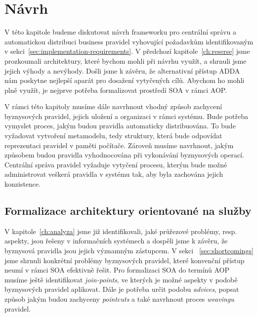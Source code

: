 

\chapter{Návrh}\label{ch:navrh}

V této kapitole budeme diskutovat návrh frameworku pro centrální správu
a automatickou distribuci business pravidel vyhovující požadavkům identifikovaným
v sekci~\ref{sec:implementation-requirements}. V předchozí kapitole~\ref{ch:reserse}
jsme prozkoumali architektury, které bychom mohli při návrhu využít, a shrnuli
jsme jejich výhody a nevýhody. Došli jsme k závěru, že alternativní přístup \gls{ADDA}
nám poskytne nejlepší aparát pro dosažení vytyčených cílů. Abychom ho mohli plně využít,
je nejprve potřeba formalizovat prostředí \gls{SOA} v rámci \gls{AOP}.

V rámci této kapitoly musíme dále navrhnout vhodný způsob zachycení byznysových pravidel,
jejich uložení a organizaci v rámci systému. Bude potřeba vymyslet proces, jakým budou pravidla
automaticky distribuována.
To bude vyžadovat vytvoření metamodelu, tedy struktury, která bude odpovídat reprezentaci pravidel
v paměti počítače.
Zároveň musíme navrhnout, jakým způsobem budou pravidla vyhodnocována při vykonávání byznysových operací.
Centrální správa pravidel vyžaduje vytyčení procesu, kterým bude možné administrovat
veškerá pravidla v systému tak, aby byla zachována jejich konzistence.

\section{Formalizace architektury orientované na služby}

V kapitole~\ref{ch:analyza} jsme již identifikovali, jaké průřezové problémy, resp. aspekty,
jsou řešeny v informačních systémech a dospěli jsme k závěru, že byznysová pravidla jsou
jejich významným zástupcem. V sekci ~\ref{sec:shortcomings} jsme shrnuli konkrétní
problémy byznysových pravidel, které konvenční přístup neumí v rámci \gls{SOA} efektivně řešit.
Pro formalizaci \gls{SOA} do termínů \gls{AOP} musíme ještě identifikovat \textit{join-points},
ve kterých je možné aspekty v podobě byznysových pravidel aplikovat. Dále je potřeba určit podobu
\textit{advices}, popsat způsob jakým budou zachyceny \textit{pointcuts} a také navrhnout proces
\textit{weavingu} pravidel.

